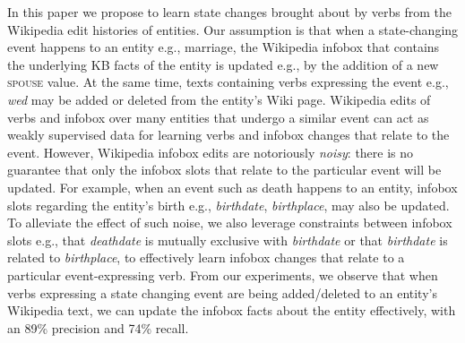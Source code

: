 In this paper we propose to learn state changes brought about by verbs from the Wikipedia edit histories of entities. Our assumption is that when a state-changing event happens to an entity e.g., marriage, the Wikipedia infobox that contains the underlying KB facts of the entity is updated e.g., by the addition of a new \textsc{spouse} value. At the same time, texts containing verbs expressing the event e.g., \textit{wed} may be added or deleted from the entity's Wiki page. Wikipedia edits of verbs and infobox over many entities that undergo a similar event can act as weakly supervised data for learning verbs and infobox changes that relate to the event. However, Wikipedia infobox edits are notoriously \textit{noisy}: there is no guarantee that only the infobox slots that relate to the particular event will be updated. For example, when an event such as death happens to an entity, infobox slots regarding the entity's birth e.g., \textit{birthdate}, \textit{birthplace}, may also be updated. To alleviate the effect of such noise, we also leverage constraints between infobox slots e.g., that \textit{deathdate} is mutually exclusive with \textit{birthdate} or that \textit{birthdate} is related to \textit{birthplace}, to effectively learn infobox changes that relate to a particular event-expressing verb. From our experiments, we observe that when verbs expressing a state changing event are being added/deleted to an entity's Wikipedia text, we can update the infobox facts about the entity effectively, with an 89\% precision and 74\% recall. 